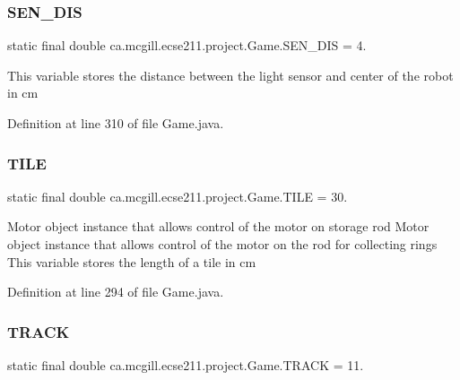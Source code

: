 \subsubsection{\texorpdfstring{S\+E\+N\+\_\+\+D\+IS}{SEN\_DIS}}
{\footnotesize\ttfamily  static  final double ca.\+mcgill.\+ecse211.\+project.\+Game.\+S\+E\+N\+\_\+\+D\+IS = 4.\hspace{0.3cm}{\ttfamily [static]}}

This variable stores the distance between the light sensor and center of the robot in cm 

Definition at line 310 of file Game.\+java.

\mbox{\label{enumca_1_1mcgill_1_1ecse211_1_1project_1_1_game_a72c2224ad4dd557dde445ebc4baaf531}} 
\subsubsection{\texorpdfstring{T\+I\+LE}{TILE}}
{\footnotesize\ttfamily  static  final double ca.\+mcgill.\+ecse211.\+project.\+Game.\+T\+I\+LE = 30.\hspace{0.3cm}{\ttfamily [static]}}

Motor object instance that allows control of the motor on storage rod Motor object instance that allows control of the motor on the rod for collecting rings This variable stores the length of a tile in cm 

Definition at line 294 of file Game.\+java.

\mbox{\label{enumca_1_1mcgill_1_1ecse211_1_1project_1_1_game_a64cf12cdd6772ac1ce351ff1dfadd626}} 
\subsubsection{\texorpdfstring{T\+R\+A\+CK}{TRACK}}
{\footnotesize\ttfamily  static  final double ca.\+mcgill.\+ecse211.\+project.\+Game.\+T\+R\+A\+CK = 11.\hspace{0.3cm}{\ttfamily [static]}}

